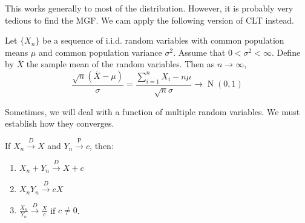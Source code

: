 \documentclass{huhtakm-template-book-v2}
\DeclareMathOperator{\prob}{P}
\DeclareMathOperator{\N}{N}
\begin{document}
\newpage
This works generally to most of the distribution. However, it is probably very tedious to find the MGF. We cam apply the following version of CLT instead.
\begin{thm}
	Let $\{X_{n}\}$ be a sequence of i.i.d. random variables with common population means $\mu$ and common population variance $\sigma^{2}$. Assume that $0<\sigma^{2}<\infty$. Define by $\overline{X}$ the sample mean of the random variables. Then as $n\to\infty$,
	\begin{equation*}
		\frac{\sqrt{n}(\overline{X}-\mu)}{\sigma}=\frac{\sum_{i=1}^{n}X_{i}-n\mu}{\sqrt{n}\sigma}\to\N(0,1)
	\end{equation*}
\end{thm}
Sometimes, we will deal with a function of multiple random variables. We must establish how they converges.
\begin{thm}
	If $X_{n}\xrightarrow{D}X$ and $Y_{n}\xrightarrow{\prob}c$, then:
	\begin{enumerate}
		\item $X_{n}+Y_{n}\xrightarrow{D}X+c$
		\item $X_{n}Y_{n}\xrightarrow{D}cX$
		\item $\frac{X_{n}}{Y_{n}}\xrightarrow{D}\frac{X}{c}$ if $c\neq 0$.
	\end{enumerate}
\end{thm}
\end{document}

